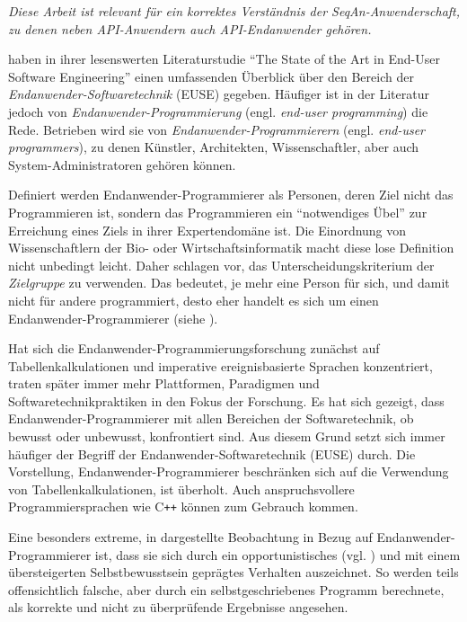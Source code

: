 \begin{important}
\textit{Diese Arbeit ist relevant für ein korrektes Verständnis der SeqAn-Anwenderschaft, zu denen neben API-Anwendern auch API-Endanwender gehören.}

\cite{Ko:2011el} haben in ihrer lesenswerten Literaturstudie ``The State of the Art in End-User Software Engineering'' einen umfassenden Überblick über den Bereich der \textit{Endanwender-Softwaretechnik} (EUSE) gegeben. Häufiger ist in der Literatur jedoch von \textit{Endanwender-Programmierung} (engl. \textit{end-user programming}) die Rede. Betrieben wird sie von \textit{Endanwender-Programmierern} (engl. \textit{end-user programmers}), zu denen Künstler, Architekten, Wissenschaftler, aber auch System-Administratoren gehören können.

Definiert werden Endanwender-Programmierer als Personen, deren Ziel nicht das Programmieren ist, sondern das Programmieren ein ``notwendiges Übel'' zur Erreichung eines Ziels in ihrer Expertendomäne ist. Die Einordnung von Wissenschaftlern der Bio- oder Wirtschaftsinformatik macht diese lose Definition nicht unbedingt leicht. Daher schlagen \cite{Ko:2011el} vor, das Unterscheidungskriterium der \textit{Zielgruppe} zu verwenden. Das bedeutet, je mehr eine Person für sich, und damit nicht für andere programmiert, desto eher handelt es sich um einen Endanwender-Programmierer (siehe ).

Hat sich die Endanwender-Programmierungsforschung zunächst auf Tabellenkalkulationen und imperative ereignisbasierte Sprachen konzentriert, traten später immer mehr Plattformen, Paradigmen und Softwaretechnikpraktiken in den Fokus der Forschung. Es hat sich gezeigt, dass Endanwender-Programmierer mit allen Bereichen der Softwaretechnik, ob bewusst oder unbewusst, konfrontiert sind. Aus diesem Grund setzt sich immer häufiger der Begriff der Endanwender-Softwaretechnik (EUSE) durch. Die Vorstellung, Endanwender-Programmierer beschränken sich auf die Verwendung von Tabellenkalkulationen, ist überholt. Auch anspruchsvollere Programmiersprachen wie C{}\verb!++! können zum Gebrauch kommen. 

Eine besonders extreme, in  dargestellte Beobachtung in Bezug auf Endanwender-Programmierer ist, dass sie sich durch ein opportunistisches (vgl. ) und mit einem übersteigerten Selbstbewusstsein geprägtes Verhalten auszeichnet. So werden teils offensichtlich falsche, aber durch ein selbstgeschriebenes Programm berechnete, als korrekte und nicht zu überprüfende Ergebnisse angesehen.


\end{important}
